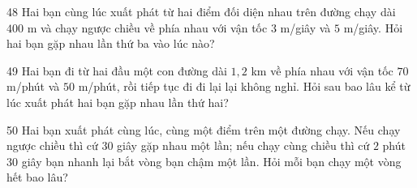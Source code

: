 \gap
\begin{probbox}{48}{}
Hai bạn cùng lúc xuất phát từ hai điểm đối diện nhau trên đường chạy dài $400$ m và chạy ngược chiều về phía nhau với vận tốc $3$ m/giây và $5$ m/giây. Hỏi hai bạn gặp nhau lần thứ ba vào lúc nào?
\end{probbox}
\gap
\begin{probbox}{49}{}
Hai bạn đi từ hai đầu một con đường dài $1{,}2$ km về phía nhau với vận tốc $70$ m/phút và $50$ m/phút, rồi tiếp tục đi đi lại lại không nghỉ. Hỏi sau bao lâu kể từ lúc xuất phát hai bạn gặp nhau lần thứ hai?
\end{probbox}
\gap
\begin{probbox}{50}{}
Hai bạn xuất phát cùng lúc, cùng một điểm trên một đường chạy. Nếu chạy ngược chiều thì cứ $30$ giây gặp nhau một lần; nếu chạy cùng chiều thì cứ $2$ phút $30$ giây bạn nhanh lại bắt vòng bạn chậm một lần. Hỏi mỗi bạn chạy một vòng hết bao lâu?
\end{probbox}

